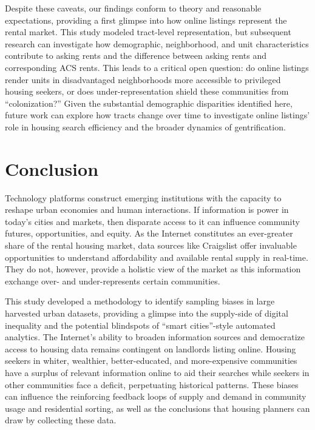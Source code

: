 \documentclass[11pt,letterpaper]{article}
\begin{document}
Despite these caveats, our findings conform to theory and reasonable expectations, providing a first glimpse into how online listings represent the rental market. This study modeled tract-level representation, but subsequent research can investigate how demographic, neighborhood, and unit characteristics contribute to asking rents and the difference between asking rents and corresponding ACS rents. This leads to a critical open question: do online listings render units in disadvantaged neighborhoods more accessible to privileged housing seekers, or does under-representation shield these communities from \enquote{colonization?} Given the substantial demographic disparities identified here, future work can explore how tracts change over time to investigate online listings' role in housing search efficiency and the broader dynamics of gentrification.

\section{Conclusion}

Technology platforms construct emerging institutions with the capacity to reshape urban economies and human interactions. If information is power in today's cities and markets, then disparate access to it can influence community futures, opportunities, and equity. As the Internet constitutes an ever-greater share of the rental housing market, data sources like Craigslist offer invaluable opportunities to understand affordability and available rental supply in real-time. They do not, however, provide a holistic view of the market as this information exchange over- and under-represents certain communities. 

This study developed a methodology to identify sampling biases in large harvested urban datasets, providing a glimpse into the supply-side of digital inequality and the potential blindspots of \enquote{smart cities}-style automated analytics. The Internet's ability to broaden information sources and democratize access to housing data remains contingent on landlords listing online. Housing seekers in whiter, wealthier, better-educated, and more-expensive communities have a surplus of relevant information online to aid their searches while seekers in other communities face a deficit, perpetuating historical patterns. These biases can influence the reinforcing feedback loops of supply and demand in community usage and residential sorting, as well as the conclusions that housing planners can draw by collecting these data.
\end{document}
